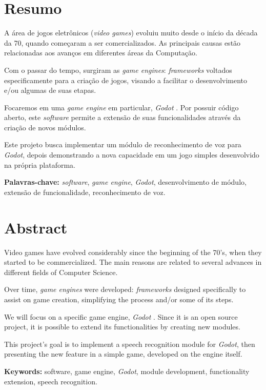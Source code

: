 
\chapter*{Resumo}

A área de jogos eletrônicos (\textit{video games}) evoluiu muito desde o início da década da 70, quando começaram a ser comercializados. As principais causas estão relacionadas aos avanços em diferentes áreas da Computação.

Com o passar do tempo, surgiram as \emph{game engines}: \textit{frameworks} voltados especificamente para a criação de jogos, visando a facilitar o desenvolvimento e/ou algumas de suas etapas.

Focaremos em uma \textit{game engine} em particular, \emph{Godot} \citep{godot}. Por possuir código aberto, este \textit{software} permite a extensão de suas funcionalidades através da criação de novos módulos.

Este projeto busca implementar um módulo de reconhecimento de voz para \textit{Godot}, depois demonstrando a nova capacidade em um jogo simples desenvolvido na própria plataforma.
\par
\bigskip
\noindent \textbf{Palavras-chave:} \textit{software}, \textit{game engine}, \textit{Godot}, desenvolvimento de módulo, extensão de funcionalidade, reconhecimento de voz.


\chapter*{Abstract}

Video games have evolved considerably since the beginning of the 70's, when they started to be commercialized. The main reasons are related to several advances in different fields of Computer Science.

Over time, \emph{game engines} were developed: \textit{frameworks} designed specifically to assist on game creation, simplifying the process and/or some of its steps.

We will focus on a specific game engine, \emph{Godot} \citep{godot}. Since it is an open source project, it is possible to extend its functionalities by creating new modules.

This project's goal is to implement a speech recognition module for \textit{Godot}, then presenting the new feature in a simple game, developed on the engine itself.
\par
\bigskip
\noindent \textbf{Keywords:} software, game engine, \textit{Godot}, module development, functionality extension, speech recognition.
